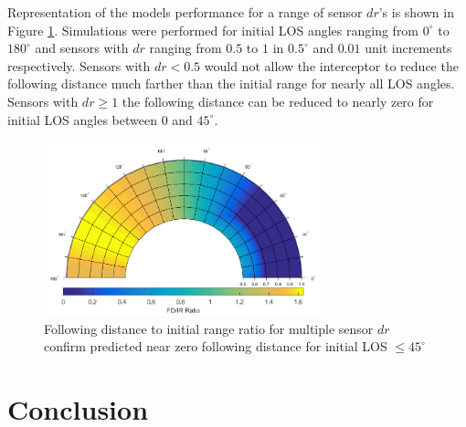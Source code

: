 \documentclass[conference]{IEEEtran}
\begin{document}
Representation of the models performance for a range of sensor $dr$'s is shown in Figure \ref{fig:Polar}. Simulations were performed for initial LOS angles ranging from $0^{\circ}$ to $180^{\circ}$ and sensors with $dr$ ranging from $0.5$ to $1$ in $0.5^{\circ}$ and $0.01$ unit increments respectively. Sensors with $dr < 0.5$ would not allow the interceptor to reduce the following distance much farther than the initial range for nearly all LOS angles. Sensors with $dr \geq 1$ the following distance can be reduced to nearly zero for initial LOS angles between $0$ and $45^{\circ}$. 

\begin{figure}[H]
	\centering
	\includegraphics[width=8cm]{correctpolar.png}
	\caption{Following distance to initial range ratio for multiple sensor $dr$ confirm predicted near zero following distance for initial LOS $\leq45^\circ$}
	\label{fig:Polar}
\end{figure}

\section{Conclusion}


\end{document}

